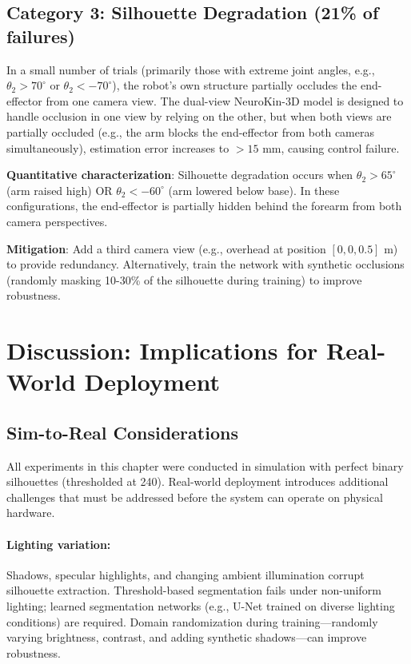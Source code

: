 \documentclass[12pt,a4paper,oneside]{report}
\begin{document}
\subsection{Category 3: Silhouette Degradation (21\% of failures)}

In a small number of trials (primarily those with extreme joint angles, e.g., $\theta_2 > 70^\circ$ or $\theta_2 < -70^\circ$), the robot's own structure partially occludes the end-effector from one camera view. The dual-view NeuroKin-3D model is designed to handle occlusion in one view by relying on the other, but when both views are partially occluded (e.g., the arm blocks the end-effector from both cameras simultaneously), estimation error increases to $>15$ mm, causing control failure.

\textbf{Quantitative characterization}: Silhouette degradation occurs when $\theta_2 > 65^\circ$ (arm raised high) OR $\theta_2 < -60^\circ$ (arm lowered below base). In these configurations, the end-effector is partially hidden behind the forearm from both camera perspectives.

\textbf{Mitigation}: Add a third camera view (e.g., overhead at position $[0, 0, 0.5]$ m) to provide redundancy. Alternatively, train the network with synthetic occlusions (randomly masking 10-30\% of the silhouette during training) to improve robustness.

\section{Discussion: Implications for Real-World Deployment}

\subsection{Sim-to-Real Considerations}

All experiments in this chapter were conducted in simulation with perfect binary silhouettes (thresholded at 240). Real-world deployment introduces additional challenges that must be addressed before the system can operate on physical hardware.

\paragraph{Lighting variation:} Shadows, specular highlights, and changing ambient illumination corrupt silhouette extraction. Threshold-based segmentation fails under non-uniform lighting; learned segmentation networks (e.g., U-Net trained on diverse lighting conditions) are required. Domain randomization during training—randomly varying brightness, contrast, and adding synthetic shadows—can improve robustness.
\end{document}
